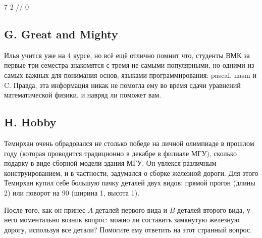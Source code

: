 

\examplee{
5 \newline
\textbackslash\textbackslash\textbackslash/\textbackslash}
{7}
{2 \newline
//}
{0}




\subsection*{G. Great and Mighty}

Илья учится уже на 4 курсе, но всё ещё отлично помнит что, студенты ВМК за первые три семестра знакомятся с тремя не самыми популярными, но одними из самых важных для понимания основ, языками программирования: pascal, nasm и C. Правда, эта информация никак не помогла ему во время сдачи уравнений математической физики, и навряд ли поможет вам.





\subsection*{H. Hobby}

Темирхан очень обрадовался не столько победе на личной олимпиаде в прошлом году (которая проводится традиционно в декабре в филиале МГУ), сколько подарку в виде сборной модели здания МГУ. Он увлекся различным конструированием, и в частности, задумался о сборке железной дороги. Для этого Темирхан купил себе большую пачку деталей двух видов: прямой прогон (длины 2) или поворот на 90 (ширина 1, высота 1). 



После того, как он принес $A$ деталей первого вида и $B$ деталей второго вида, у него моментально возник вопрос: можно ли составить замкнутую железную дорогу, используя все детали? Помогите ему ответить на этот странный вопрос.

